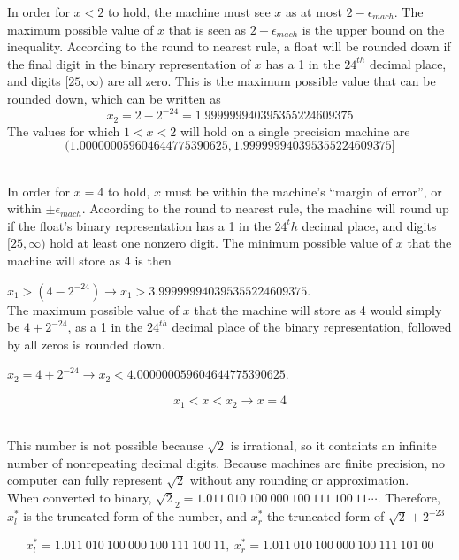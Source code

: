 	In order for $x<2$ to hold, the machine must see $x$ as at most $2-\epsilon_{mach}$. The maximum possible value of $x$ that is seen
	as $2-\epsilon_{mach}$ is the upper bound on the inequality. According to the round to nearest rule, a float will be rounded down if
	the final digit in the binary representation of $x$ has a 1 in the $24^{th}$ decimal place, and digits $[25, \infty)$ are all zero.
	This is the maximum possible value that can be rounded down, which can be written as
	$$x_2 = 2-2^{-24} = 1.999999940395355224609375$$
The values for which $1<x<2$ will hold on a single precision machine are $$(1.000000059604644775390625, 1.999999940395355224609375]$$ \\

\item
	In order for $x=4$ to hold, $x$ must be within the machine's ``margin of error'', or within $\pm \epsilon_{mach}$. According to the
	round to nearest rule, the machine will round up if the float's binary representation has a 1 in the $24^th$ decimal place, and digits
	$[25, \infty)$ hold at least one nonzero digit. The minimum possible value of $x$ that the machine will store as 4 is then

	$x_1 > (4-2^{-24}) \rightarrow x_1 > 3.999999940395355224609375$. \\

	The maximum possible value of $x$ that the machine will store as 4 would simply be $4+2^{-24}$, as a 1 in the $24^{th}$ decimal place
	of the binary representation, followed by all zeros is rounded down.

	$x_2 = 4+2^{-24} \rightarrow x_2 < 4.000000059604644775390625$.

	$$x_1 < x < x_2 \rightarrow x=4$$ \\

\item

	This number is not possible because $\sqrt{2}$ is irrational, so it containts an infinite number of nonrepeating decimal digits.
	Because machines are finite precision, no computer can fully represent $\sqrt{2}$ without any rounding or approximation. \\

	When converted to binary, $\sqrt{2}_2 = 1.011\ 010\ 100\ 000\ 100\ 111\ 100\ 11\cdots$. Therefore, $x^*_l$ is the truncated form
	of the number, and $x^*_r$ the truncated form of $\sqrt{2} + 2^{-23}$

	$$x^*_l = 1.011\ 010\ 100\ 000\ 100\ 111\ 100\ 11,\ x^*_r = 1.011\ 010\ 100\ 000\ 100\ 111\ 101\ 00$$

